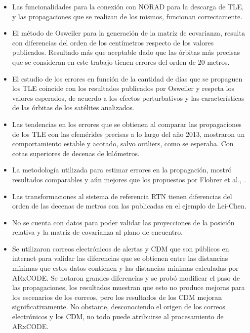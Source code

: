  \begin{itemize}
  \item Las funcionalidades para la conexi\'on con NORAD para la descarga de TLE, y las propagaciones que se realizan de los mismos, funcionan correctamente.\\
  \item El m\'etodo de Osweiler para la generaci\'on de la matriz de covarianza, resulta con diferencias del orden de los cent\'imetros respecto de los valores publicados. Resultado m\'as que aceptable dado que las \'orbitas m\'as precisas que se consideran en este trabajo tienen errores del orden de 20 metros.\\
  \item El estudio de los errores en funci\'on de la cantidad de d\'ias que se propaguen los TLE coincide con los resultados publicados por Osweiler y respeta los valores esperados, de acuerdo a los efectos perturbativos y las caracter\'isticas de las \'orbitas de los sat\'elites analizados.\\
  \item Las tendencias en los errores que se obtienen al comparar las propagaciones de los TLE con las efem\'erides precisas a lo largo del a\~no 2013, mostraron un comportamiento estable y acotado, salvo outliers, como se esperaba. Con cotas superiores de decenas de kil\'ometros.\\
  \item La metodolog\'ia utilizada para estimar errores en la propagaci\'on, mostr\'o resultados comparables y a\'un mejores que los propuestos por Flohrer et al., \citep{flohrer2008assessment}.
  \item Las transformaciones al sistema de referencia RTN tienen diferencias del orden de las decenas de metros con las publicadas en el ejemplo de Lei-Chen.\\
  \item No se cuenta con datos para poder validar las proyecciones de la posici\'on relativa y la matriz de covarianza al plano de encuentro.\\
  \item Se utilizaron correos electr\'onicos de alertas y CDM que son p\'ublicos en internet para validar las diferencias que se obtienen entre las distancias m\'inimas que estos datos contienen y las distancias m\'inimas calculadas por ARxCODE. Se notaron grandes diferencias y se prob\'o modificar el paso de las propagaciones, los resultados muestran que esto no produce mejoras para los escenarios de los correos, pero los resultados de los CDM mejoran significativamente. No obstante, desconociendo el origen de los correos electr\'onicos y los CDM, no todo puede atribuirse al procesamiento de ARxCODE.\\

\end{itemize}
